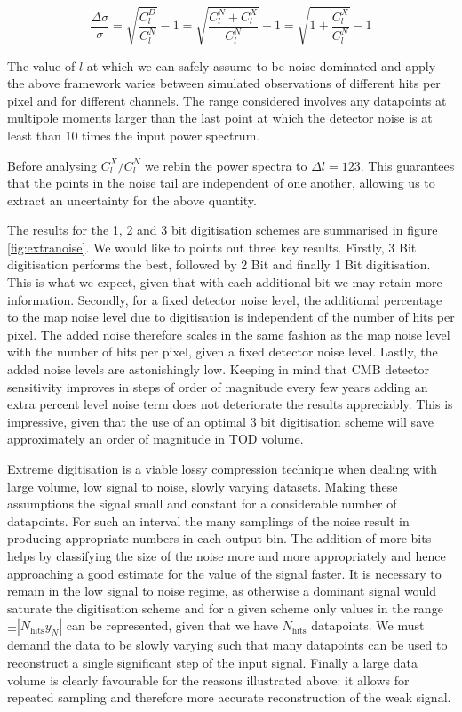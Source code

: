 \documentclass[apj]{emulateapj}
\begin{document}
\[\frac{\Delta \sigma}{\sigma} = \sqrt{\frac{C_l^D}{C_l^{N}}} - 1  = \sqrt{\frac{C_l^N + C_l^X}{C_l^{N}}} - 1 = \sqrt{1 + \frac{C_l^X}{C_l^{N}}} - 1  \]

The value of $l$ at which we can safely assume to be noise dominated and apply the above framework varies between simulated observations of different hits per pixel and for different channels. The range considered involves any datapoints at multipole moments larger than the last point at which the detector noise is at least than 10 times the input power spectrum.

Before analysing $C_l^X/C_l^N$ we rebin the power spectra to $\Delta l = 123$. This guarantees that the points in the noise tail are independent of one another, allowing us to extract an uncertainty for the above quantity.


The results for the 1, 2 and 3 bit digitisation schemes are summarised in figure \ref{fig:extranoise}. We would like to points out three key results. Firstly, 3 Bit digitisation performs the best, followed by 2 Bit and finally 1 Bit digitisation. This is what we expect, given that with each additional bit we may retain more information. Secondly, for a fixed detector noise level, the additional percentage to the map noise level due to digitisation is independent of the number of hits per pixel. The added noise therefore scales in the same fashion as the map noise level with the number of hits per pixel, given a fixed detector noise level. Lastly, the added noise levels are astonishingly low. Keeping in mind that CMB detector sensitivity improves in steps of order of magnitude every few years adding an extra percent level noise term does not deteriorate the results appreciably. This is impressive, given that the use of an optimal 3 bit digitisation scheme will save approximately an order of magnitude in TOD volume.

Extreme digitisation is a viable lossy compression technique when dealing with large volume, low signal to noise, slowly varying datasets. Making these assumptions the signal small and constant for a considerable number of datapoints. For such an interval the many samplings of the noise result in producing appropriate numbers in each output bin. The addition of more bits helps by classifying the size of the noise more and more appropriately and hence approaching a good estimate for the value of the signal faster. It is necessary to remain in the low signal to noise regime, as otherwise a dominant signal would saturate the digitisation scheme and for a given scheme only values in the range $\pm |N_{\mathrm{hits}}y_N|$ can be represented, given that we have $N_{\mathrm{hits}}$ datapoints. We must demand the data to be slowly varying such that many datapoints can be used to reconstruct a single significant step of the input signal. Finally a large data volume is clearly favourable for the reasons illustrated above: it allows for repeated sampling and therefore more accurate reconstruction of the weak signal.
\end{document}
